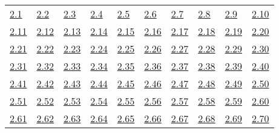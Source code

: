 \begin{tabular}{llllllllll}
\hyperref[Exercise 2.1]{2.1} &
\hyperref[Exercise 2.2]{2.2} &
\hyperref[Exercise 2.3]{2.3} &
\hyperref[Exercise 2.4]{2.4} &
\hyperref[Exercise 2.5]{2.5} &
\hyperref[Exercise 2.6]{2.6} &
\hyperref[Exercise 2.7]{2.7} &
\hyperref[Exercise 2.8]{2.8} &
\hyperref[Exercise 2.9]{2.9} &
\hyperref[Exercise 2.10]{2.10}
\\ 
\hyperref[Exercise 2.11]{2.11} &
\hyperref[Exercise 2.12]{2.12} &
\hyperref[Exercise 2.13]{2.13} &
\hyperref[Exercise 2.14]{2.14} &
\hyperref[Exercise 2.15]{2.15} &
\hyperref[Exercise 2.16]{2.16} &
\hyperref[Exercise 2.17]{2.17} &
\hyperref[Exercise 2.18]{2.18} &
\hyperref[Exercise 2.19]{2.19} &
\hyperref[Exercise 2.20]{2.20}
\\ 
\hyperref[Exercise 2.21]{2.21} &
\hyperref[Exercise 2.22]{2.22} &
\hyperref[Exercise 2.23]{2.23} &
\hyperref[Exercise 2.24]{2.24} &
\hyperref[Exercise 2.25]{2.25} &
\hyperref[Exercise 2.26]{2.26} &
\hyperref[Exercise 2.27]{2.27} &
\hyperref[Exercise 2.28]{2.28} &
\hyperref[Exercise 2.29]{2.29} &
\hyperref[Exercise 2.30]{2.30}
\\ 
\hyperref[Exercise 2.31]{2.31} &
\hyperref[Exercise 2.32]{2.32} &
\hyperref[Exercise 2.33]{2.33} &
\hyperref[Exercise 2.34]{2.34} &
\hyperref[Exercise 2.35]{2.35} &
\hyperref[Exercise 2.36]{2.36} &
\hyperref[Exercise 2.37]{2.37} &
\hyperref[Exercise 2.38]{2.38} &
\hyperref[Exercise 2.39]{2.39} &
\hyperref[Exercise 2.40]{2.40}
\\ 
\hyperref[Exercise 2.41]{2.41} &
\hyperref[Exercise 2.42]{2.42} &
\hyperref[Exercise 2.43]{2.43} &
\hyperref[Exercise 2.44]{2.44} &
\hyperref[Exercise 2.45]{2.45} &
\hyperref[Exercise 2.46]{2.46} &
\hyperref[Exercise 2.47]{2.47} &
\hyperref[Exercise 2.48]{2.48} &
\hyperref[Exercise 2.49]{2.49} &
\hyperref[Exercise 2.50]{2.50}
\\ 
\hyperref[Exercise 2.51]{2.51} &
\hyperref[Exercise 2.52]{2.52} &
\hyperref[Exercise 2.53]{2.53} &
\hyperref[Exercise 2.54]{2.54} &
\hyperref[Exercise 2.55]{2.55} &
\hyperref[Exercise 2.56]{2.56} &
\hyperref[Exercise 2.57]{2.57} &
\hyperref[Exercise 2.58]{2.58} &
\hyperref[Exercise 2.59]{2.59} &
\hyperref[Exercise 2.60]{2.60}
\\ 
\hyperref[Exercise 2.61]{2.61} &
\hyperref[Exercise 2.62]{2.62} &
\hyperref[Exercise 2.63]{2.63} &
\hyperref[Exercise 2.64]{2.64} &
\hyperref[Exercise 2.65]{2.65} &
\hyperref[Exercise 2.66]{2.66} &
\hyperref[Exercise 2.67]{2.67} &
\hyperref[Exercise 2.68]{2.68} &
\hyperref[Exercise 2.69]{2.69} &
\hyperref[Exercise 2.70]{2.70}

\end{tabular}
